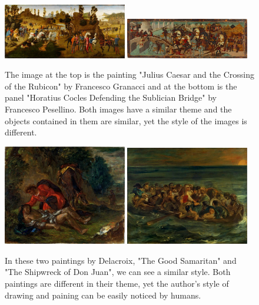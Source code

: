 \documentclass[a4paper,twocolumn]{article}
\begin{document}
\begin{figure}[!htb]
\centering
\includegraphics[width=0.48\textwidth]{diff_caesar}
\includegraphics[width=0.48\textwidth]{diff_horatius}
\caption{The image at the top is the painting "Julius Caesar and the Crossing
of the Rubicon" by Francesco Granacci and at the bottom is the panel "Horatius
Cocles Defending the Sublician Bridge" by Francesco Pesellino.  Both images
have a similar theme and the objects contained in them are similar, yet the
style of the images is different.}
\label{diff}
\end{figure}

\begin{figure}[!htb]
\centering
\includegraphics[width=0.48\textwidth]{sim_delacroix_samaritan}
\includegraphics[width=0.48\textwidth]{sim_delacroix_shipwreck}
\caption{In these two paintings by Delacroix, "The Good Samaritan" and "The
Shipwreck of Don Juan", we can see a similar style.  Both paintings are
different in their theme, yet the author's style of drawing and paining can be
easily noticed by humans.}
\label{similar}
\end{figure}
\end{document}
